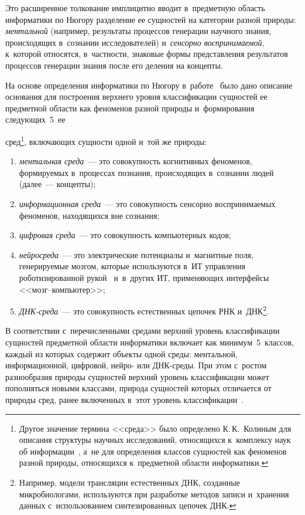 \begin{multicols}{2}
  Это расширенное толкование имплицитно вводит в~предметную область 
информатики по Нюгору разделение ее сущностей на категории разной 
природы: \textit{ментальной} (например, результаты процессов генерации 
научного знания, происходящих в~сознании исследователей) и~\textit{сенсорно 
воспринимаемой}, к~которой относятся, в~частности, знаковые формы 
представления результатов процессов генерации знания после его деления на\linebreak 
кон\-цепты.


  На основе определения информатики по Нюгору в~работе~\cite{29-zac} было 
дано описание основания для по\-стро\-ения верхнего уровня классификации 
сущностей ее предметной об\-ласти как феноменов разной природы 
и~формирования следующих~5~ее\linebreak\vspace*{-12pt}

\pagebreak

\noindent
  сред\footnote{Другое значение термина 
<<среда>> было определено К.\,К.~Колиным для описания структуры научных исследований, 
относящихся к~комплексу наук об информации~\cite{30-zac}, а~не для определения классов 
сущностей как феноменов разной природы, относящихся к~предметной об\-ласти информатики.}, 
включающих сущности одной и~той же природы:
  \begin{enumerate}[(1)]
\item \textit{ментальная среда}~--- это совокупность когнитивных 
феноменов, формируемых в~процессах познания, происходящих в~сознании 
людей (далее~--- концепты);
\item \textit{информационная среда}~--- это совокупность сенсорно 
воспринимаемых феноменов, находящихся вне сознания;
\item \textit{цифровая среда}~--- это совокупность компьютерных кодов;
\item \textit{нейросреда}~--- это электрические потенциалы и~магнитные 
поля, генерируемые мозгом, которые используются в~ИТ управления 
роботизированной рукой~\cite{31-zac} и~в~других ИТ, применяющих 
интерфейсы <<мозг--компью\-тер>>;
\item \textit{ДНК-среда}~--- это совокупность естественных цепочек РНК 
и~ДНК\footnote{Например, модели трансляции естественных ДНК, созданные 
микробиологами, используются при разработке методов записи и~хранения данных 
с~использованием синтезированных цепочек ДНК.}.
  \end{enumerate}
  
  В соответствии с~перечисленными средами верхний уровень классификации 
сущностей предметной области информатики включает как 
минимум~5~классов, каждый из которых содержит объекты одной среды: ментальной, 
информационной, цифровой, нейро- или ДНК-сре\-ды. При этом с~ростом 
разнообразия природы сущностей верхний уровень классификации может 
пополняться новыми классами, природа сущностей которых отличается от 
природы сред, ранее включенных в~этот уровень классификации~\cite{8-zac}.
  

\end{multicols}

